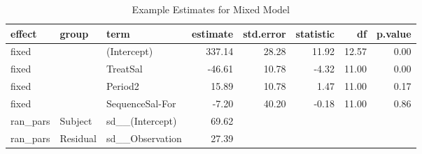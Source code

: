 \begin{table}[ht]
\centering
\begin{tabular}{lll|rrrrr}
  \hline
effect & group & term & estimate & std.error & statistic & df & p.value \\ 
  \hline
fixed &  & (Intercept) & 337.14 & 28.28 & 11.92 & 12.57 & 0.00 \\ 
  fixed &  & TreatSal & -46.61 & 10.78 & -4.32 & 11.00 & 0.00 \\ 
  fixed &  & Period2 & 15.89 & 10.78 & 1.47 & 11.00 & 0.17 \\ 
  fixed &  & SequenceSal-For & -7.20 & 40.20 & -0.18 & 11.00 & 0.86 \\ 
  ran\_pars & Subject & sd\_\_(Intercept) & 69.62 &  &  &  &  \\ 
  ran\_pars & Residual & sd\_\_Observation & 27.39 &  &  &  &  \\ 
   \hline
\end{tabular}
\caption{Example Estimates for Mixed Model} 
\label{modelTable}
\end{table}

